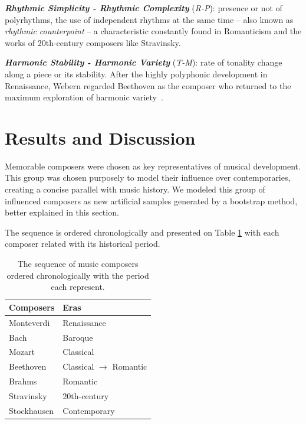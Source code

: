 \documentclass[
 aip,
 jmp,
 amsmath,amssymb,
 reprint,
]{revtex4-1}
\begin{document}
{\bf \em{ Rhythmic Simplicity - Rhythmic Complexity}} (\emph{R-P}): presence or not of polyrhythms, the
use of independent rhythms at the same time -- also known as
\textit{rhythmic counterpoint}\cite{BennettHistory} -- a characteristic
constantly found in Romanticism and the works of 20th-century composers like Stravinsky.

{\bf \em{ Harmonic Stability - Harmonic Variety}} (\emph{T-M}):
rate of tonality change along a piece or its stability. After the highly
polyphonic development in Renaissance, Webern regarded Beethoven as the
composer who returned to the maximum exploration of harmonic variety~\cite{Webern}.

\section{Results and Discussion}
\label{sec:results}

Memorable composers were chosen as key representatives
of musical development. 
This group was chosen purposely to model their influence
over contemporaries, creating a concise parallel with music history. We modeled this group of influenced
composers as new artificial samples generated by a bootstrap method, better
explained in this section.

The sequence
is ordered chronologically and presented on Table \ref{tab:table0} with
each composer related with its historical period.

\begin{table}[ht]
\caption{\label{tab:table0} The sequence of music composers ordered chronologically
with the period each represent.}

\begin{tabular}{|l||l|}
\hline

 Composers       &  Eras \\ \hline

 Monteverdi      & Renaissance \\
 Bach            & Baroque \\
 Mozart          & Classical \\
 Beethoven       & Classical $\to$ Romantic \\
 Brahms          & Romantic \\
 Stravinsky      & 20th-century \\
 Stockhausen     & Contemporary\\

\hline
\end{tabular}
\end{table}
\end{document}
